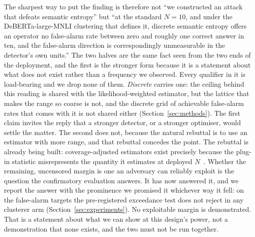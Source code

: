 The sharpest way to put the finding is therefore not ``we constructed an attack that defeats
semantic entropy'' but ``at the standard $N{=}10$, and under the DeBERTa-large-MNLI
clustering that defines it, discrete semantic entropy offers an
operator no false-alarm rate between zero and roughly one correct answer in ten, and the
false-alarm direction is correspondingly unmeasurable in the detector's own units.'' The two halves are the same fact
seen from the two ends of the deployment, and the first is the stronger form because it is a
statement about what does not exist rather than a frequency we observed. Every qualifier in
it is load-bearing and we drop none of them. \emph{Discrete} carries one: the ceiling behind this reading
is shared with the likelihood-weighted estimator, but the lattice that makes the range so
coarse is not, and the discrete grid of achievable false-alarm rates that comes with it is
not shared either (Section~\ref{sec:methods}). The
first claim invites the reply that a stronger detector, or a stronger optimiser, would settle
the matter. The second does not, because the natural rebuttal is to use an estimator with
more range, and that rebuttal concedes the point. The rebuttal is already being built: coverage-adjusted
estimators exist precisely because the plug-in statistic misrepresents the quantity it
estimates at deployed $N$~\citep{mccabe2025alphabet, pan2026shade}. Whether the remaining, uncensored margin is one an adversary can
reliably exploit is the question the confirmatory evaluation answers. It has now answered it,
and we report the answer with the prominence we promised it whichever way it fell: on the
false-alarm targets the pre-registered exceedance test does not reject in any clusterer arm
(Section~\ref{sec:experiments}). No exploitable margin is demonstrated. That is a statement
about what we can show at this design's power, not a demonstration that none exists, and the
two must not be run together.

